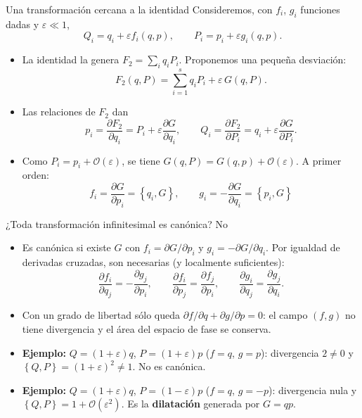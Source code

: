 \documentclass[spanish]{beamer}
\newcommand{\pd}[2]{\frac{\partial #1}{\partial #2}}
\newcommand{\pb}[2]{\left\{#1,#2\right\}}   %
\begin{document}
\begin{frame}{Una transformación cercana a la identidad}
Consideremos, con $f_i$, $g_i$ funciones dadas y $\varepsilon\ll 1$,
\[
  Q_i = q_i + \varepsilon f_i(q,p), \qquad P_i = p_i + \varepsilon g_i(q,p) .
\]
\begin{itemize}
  \item<2-> La identidad la genera $F_2 = \sum_i q_iP_i$. Proponemos una pequeña
        desviación:
  \[
    F_2(q,P) = \sum_{i=1}^{s} q_iP_i + \varepsilon\,G(q,P) .
  \]
  \item<3-> Las relaciones de $F_2$ dan
  \[
    p_i = \pd{F_2}{q_i} = P_i + \varepsilon\pd{G}{q_i},
    \qquad
    Q_i = \pd{F_2}{P_i} = q_i + \varepsilon\pd{G}{P_i} .
  \]
  \item<4-> Como $P_i = p_i + \mathcal O(\varepsilon)$, se tiene
        $G(q,P) = G(q,p) + \mathcal O(\varepsilon)$. A primer orden:
  \[
    \boxed{\ f_i = \pd{G}{p_i} = \pb{q_i}{G}, \qquad g_i = -\pd{G}{q_i} = \pb{p_i}{G}\ }
  \]
\end{itemize}
\end{frame}

\begin{frame}{¿Toda transformación infinitesimal es canónica? No}
\begin{itemize}
  \item<1-> Es canónica si existe $G$ con $f_i = \partial G/\partial p_i$ y
        $g_i = -\partial G/\partial q_i$. Por igualdad de derivadas cruzadas, son
        necesarias (y localmente suficientes):
  \[
    \pd{f_i}{q_j} = -\pd{g_j}{p_i}, \qquad
    \pd{f_i}{p_j} = \pd{f_j}{p_i}, \qquad
    \pd{g_i}{q_j} = \pd{g_j}{q_i} .
  \]
  \item<2-> Con un grado de libertad sólo queda
        $\partial f/\partial q + \partial g/\partial p = 0$: el campo
        $(f,g)$ no tiene divergencia y el área del espacio de fase se conserva.
  \item<3-> \textbf{Ejemplo:} $Q = (1+\varepsilon)q$, $P = (1+\varepsilon)p$
        ($f=q$, $g=p$): divergencia $2\neq 0$ y
        $\pb{Q}{P} = (1+\varepsilon)^2\neq 1$. \alert{No es canónica.}
  \item<4-> \textbf{Ejemplo:} $Q = (1+\varepsilon)q$, $P = (1-\varepsilon)p$
        ($f=q$, $g=-p$): divergencia nula y $\pb{Q}{P} = 1 + \mathcal O(\varepsilon^2)$.
        Es la \textbf{dilatación} generada por $G = qp$.
\end{itemize}
\end{frame}

\end{document}

